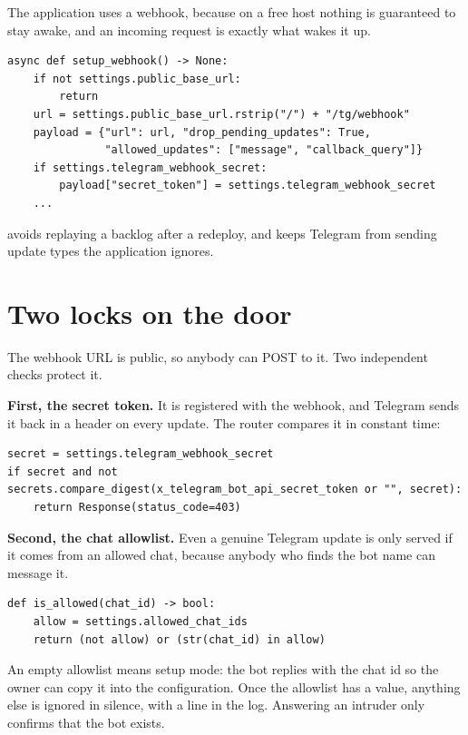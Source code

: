 The application uses a webhook, because on a free host nothing is guaranteed to
stay awake, and an incoming request is exactly what wakes it up.

\begin{lstlisting}[style=py]
async def setup_webhook() -> None:
    if not settings.public_base_url:
        return
    url = settings.public_base_url.rstrip("/") + "/tg/webhook"
    payload = {"url": url, "drop_pending_updates": True,
               "allowed_updates": ["message", "callback_query"]}
    if settings.telegram_webhook_secret:
        payload["secret_token"] = settings.telegram_webhook_secret
    ...
\end{lstlisting}

 avoids replaying a backlog after a redeploy, and
 keeps Telegram from sending update types the application
ignores.

\section{Two locks on the door}

The webhook URL is public, so anybody can POST to it. Two independent checks
protect it.

\textbf{First, the secret token.} It is registered with the webhook, and
Telegram sends it back in a header on every update. The router compares it in
constant time:

\begin{lstlisting}[style=py]
secret = settings.telegram_webhook_secret
if secret and not secrets.compare_digest(x_telegram_bot_api_secret_token or "", secret):
    return Response(status_code=403)
\end{lstlisting}

\textbf{Second, the chat allowlist.} Even a genuine Telegram update is only
served if it comes from an allowed chat, because anybody who finds the bot name
can message it.

\begin{lstlisting}[style=py]
def is_allowed(chat_id) -> bool:
    allow = settings.allowed_chat_ids
    return (not allow) or (str(chat_id) in allow)
\end{lstlisting}

An empty allowlist means setup mode: the bot replies with the chat id so the
owner can copy it into the configuration. Once the allowlist has a value,
anything else is ignored in silence, with a line in the log. Answering an
intruder only confirms that the bot exists.

